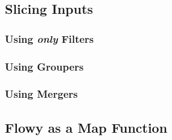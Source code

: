 \subsection{Slicing Inputs}\label{subsec:slice-input}
		\subsubsection{Using \emph{only} Filters}\label{subsec:filters-only}
		\subsubsection{Using Groupers}\label{subsec:using-groupers}
		\subsubsection{Using Mergers}\label{subsec:using-mergers}
\subsection{Flowy as a Map Function}\label{subsec:flowy-map}

